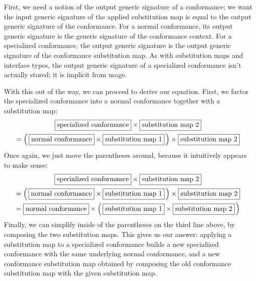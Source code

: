 \documentclass[a4paper,headsepline,bibliography=totoc,toc=flat,fleqn,twoside=semi]{scrbook}
\theoremstyle{definition}
\theoremstyle{definition}
\theoremstyle{definition}
\newcommand{\mathboxed}[1]{\boxed{\mbox{\vphantom{pI\texttt{pI}}#1}}}
\begin{document}
First, we need a notion of the output generic signature of a conformance; we want the input generic signature of the applied substitution map is equal to the output generic signature of the conformance. For a normal conformance, its output generic signature is the generic signature of the conformance context. For a specialized conformance, the output generic signature is the output generic signature of the conformance substitution map. As with substitution maps and interface types, the output generic signature of a specialized conformance isn't actually stored; it is implicit from usage.

With this out of the way, we can proceed to derive our equation. First, we factor the specialized conformance into a normal conformance together with a substitution map:
\begin{gather*}
\mathboxed{specialized conformance}\times\mathboxed{substitution map 2}\\
=\left(\,\mathboxed{normal conformance} \times \mathboxed{substitution map 1}\,\right) \times \mathboxed{substitution map 2}
\end{gather*}
Once again, we just move the parentheses around, because it intuitively appears to make sense:
\begin{multline*}
\mathboxed{specialized conformance}\times\mathboxed{substitution map 2}\\
=\left(\,\mathboxed{normal conformance} \times \mathboxed{substitution map 1}\,\right) \times \mathboxed{substitution map 2}\\
=\mathboxed{normal conformance} \times \left(\,\mathboxed{substitution map 1} \times \mathboxed{substitution map 2}\,\right)
\end{multline*}
Finally, we can simplify inside of the parentheses on the third line above, by composing the two substitution maps. This gives us our answer: applying a substitution map to a specialized conformance builds a new specialized conformance with the same underlying normal conformance, and a new conformance substitution map obtained by composing the old conformance substitution map with the given substitution map.
\end{document}

